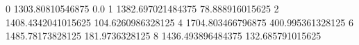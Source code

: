 0 1303.80810546875 0.0
1 1382.697021484375 78.888916015625
2 1408.4342041015625 104.6260986328125
4 1704.803466796875 400.995361328125
6 1485.78173828125 181.9736328125
8 1436.493896484375 132.685791015625
